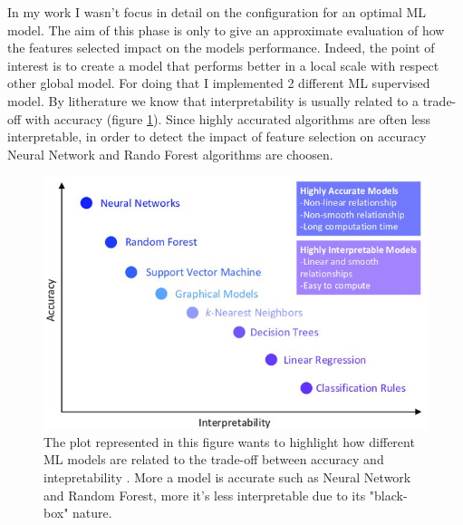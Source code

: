 In my work I wasn't focus in detail on the configuration for an optimal ML model. The aim of this phase is only to give an approximate evaluation of how the features selected impact on the models performance. Indeed, the point of interest is to create a model that performs better in a local scale with respect other global model.
For doing that I implemented 2 different ML supervised model.
By litherature we know that interpretability is usually related to a trade-off with accuracy (figure \ref{fig:trade-off}).
Since highly accurated algorithms are often less interpretable, in order to detect the impact of feature selection on accuracy Neural Network and Rando Forest algorithms are choosen. 
\begin{figure}[H]
    \centering
    \includegraphics[scale=1.4]{images/interpretability_accuracy_tradeoff.jpg}
    \caption{The plot represented in this figure wants to highlight how different ML models are related to the trade-off between accuracy and intepretability \cite{morocho2019machine}. More a model is accurate such as Neural Network and Random Forest, more it's less interpretable due to its "black-box" nature.}
    \label{fig:trade-off}
\end{figure}
